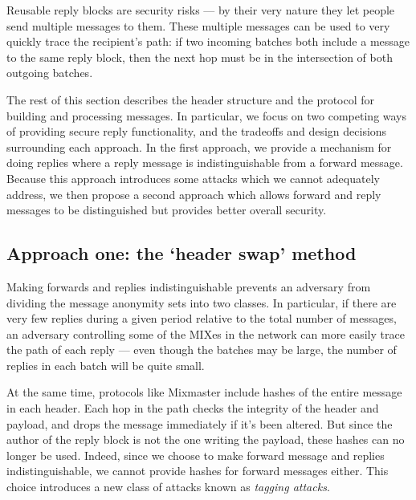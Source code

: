 \documentclass{llncs}
\begin{document}
Reusable reply blocks are security risks --- by their very nature they
let people send multiple messages to them. These multiple messages can be
used to very quickly trace the recipient's path: if two incoming batches
both include a message to the same reply block, then the next hop must
be in the intersection of both outgoing batches.


The rest of this section describes the header structure and the
protocol for building and processing messages. In particular, we
focus on two competing ways of providing secure reply functionality,
and the tradeoffs and design decisions surrounding each approach. In
the first approach, we provide a mechanism for doing replies where a
reply message is indistinguishable from a forward message. Because this
approach introduces some attacks which we cannot adequately address, we
then propose a second approach which allows forward and reply messages
to be distinguished but provides better overall security.


\subsection{Approach one: the `header swap' method}

Making forwards and replies indistinguishable prevents an adversary from
dividing the message anonymity sets into two classes. In particular, if
there are very few replies during a given period relative to the total
number of messages, an adversary controlling some of the MIXes in the
network can more easily trace the path of each reply --- even though
the batches may be large, the number of replies in each batch will be
quite small.

At the same time, protocols like Mixmaster include hashes of the entire
message in each header. Each hop in the path checks the integrity of
the header and payload, and drops the message immediately if it's been
altered. But since the author of the reply block is not the one writing
the payload, these hashes can no longer be used. Indeed, since we choose
to make forward message and replies indistinguishable, we cannot provide
hashes for forward messages either. This choice introduces a new class
of attacks known as \emph{tagging attacks}.
\end{document}

